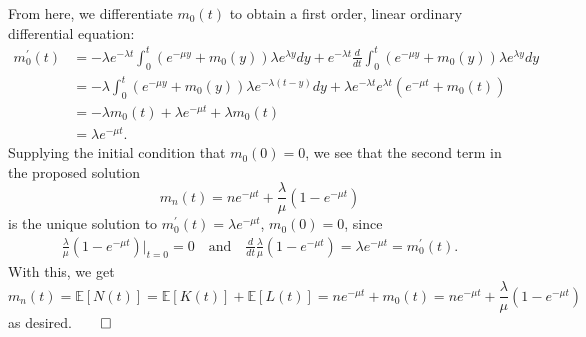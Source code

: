 \documentclass[11pt, letterpaper]{article}
\newcommand{\mbb}[1]{\mathbb{#1}}
\begin{document}
    From here, we differentiate $m_0(t)$ to obtain a first order, linear ordinary differential equation:
    \begin{align*}
        m_0^\prime(t)&=-\lambda e^{-\lambda t}\int_0^t\left(e^{-\mu y}+m_0(y)\right)\lambda e^{\lambda y}dy+e^{-\lambda t} \frac{d}{dt}\int_0^t\left(e^{-\mu y}+m_0(y)\right)\lambda e^{\lambda y}dy\\
        &=-\lambda \int_0^t\left(e^{-\mu y}+m_0(y)\right)\lambda e^{-\lambda (t-y)}dy+\lambda e^{-\lambda t}e^{\lambda t}(e^{-\mu t}+m_0(t))\\
        &=-\lambda m_0(t)+\lambda e^{-\mu t}+\lambda m_0(t)\\
        &=\lambda e^{-\mu t}.
    \end{align*}
    Supplying the initial condition that $m_0(0)=0$, we see that the second term in the proposed solution
    \[m_n(t)=ne^{-\mu t}+\frac{\lambda}{\mu}(1-e^{-\mu t})\]
    is the unique solution to $m_0^\prime(t)=\lambda e^{-\mu t}$, $m_0(0)=0$, since
    \begin{align*}
        \frac{\lambda}{\mu}(1-e^{-\mu t})\bigg|_{t=0}=0\quad\text{and}\quad\frac{d}{dt}\frac{\lambda}{\mu}(1-e^{-\mu t})=\lambda e^{-\mu t}=m_0^\prime(t).
    \end{align*}
    With this, we get
    \[m_n(t)=\mbb{E}[N(t)]=\mbb{E}[K(t)]+\mbb{E}[L(t)]=ne^{-\mu t}+m_0(t)=ne^{-\mu t}+\frac{\lambda}{\mu}(1-e^{-\mu t})\]
    as desired.\hfill{$\qed$}\\[10pt]
\end{document}
